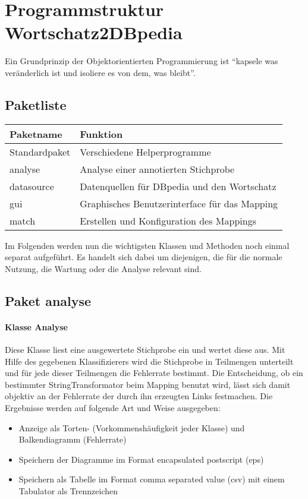 \section{Programmstruktur Wortschatz2DBpedia}
Ein Grundprinzip der Objektorientierten Programmierung ist "`kapsele was veränderlich ist und isoliere es von dem, was bleibt"'.
\subsection{Paketliste}

\begin{center}
\begin{tabular}{ll}
\toprule
Paketname\footnotemark	&Funktion\\
\hline
Standardpaket	&Verschiedene Helperprogramme\\
analyse		&Analyse einer annotierten Stichprobe\\
datasource	&Datenquellen für DBpedia und den Wortschatz\\
gui		&Graphisches Benutzerinterface für das Mapping\\
match		&Erstellen und Konfiguration des Mappings\\
\bottomrule
\end{tabular}
\end{center}

Im Folgenden werden nun die wichtigsten Klassen und Methoden noch einmal separat aufgeführt.
Es handelt sich dabei um diejenigen, die für die normale Nutzung, die Wartung oder die Analyse relevant sind.
\subsection{Paket analyse}
\paragraph{Klasse Analyse}
Diese Klasse liest eine ausgewertete Stichprobe ein und wertet diese aus.
Mit Hilfe des gegebenen Klassifizierers wird die Stichprobe in Teilmengen unterteilt und für jede dieser Teilmengen die Fehlerrate bestimmt.
Die Entscheidung, ob ein bestimmter StringTransformator beim Mapping benutzt wird, lässt sich damit objektiv an der Fehlerrate der durch ihn erzeugten Links festmachen.
Die Ergebnisse werden auf folgende Art und Weise ausgegeben:
\begin{itemize}
\item Anzeige als Torten- (Vorkommenshäufigkeit jeder Klasse) und Balkendiagramm (Fehlerrate)
\item Speichern der Diagramme im Format encapsulated postscript (eps)
\item Speichern als Tabelle im Format comma separated value (csv) mit einem Tabulator als Trennzeichen
\end{itemize}
